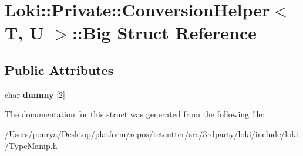 \hypertarget{structLoki_1_1Private_1_1ConversionHelper_1_1Big}{}\section{Loki\+:\+:Private\+:\+:Conversion\+Helper$<$ T, U $>$\+:\+:Big Struct Reference}
\label{structLoki_1_1Private_1_1ConversionHelper_1_1Big}
\subsection*{Public Attributes}
\begin{DoxyCompactItemize}
\item 
\hypertarget{structLoki_1_1Private_1_1ConversionHelper_1_1Big_a58c63ac7e3902931b7747405d51d8d40}{}char {\bfseries dummy} \mbox{[}2\mbox{]}\label{structLoki_1_1Private_1_1ConversionHelper_1_1Big_a58c63ac7e3902931b7747405d51d8d40}

\end{DoxyCompactItemize}


The documentation for this struct was generated from the following file\+:\begin{DoxyCompactItemize}
\item 
/\+Users/pourya/\+Desktop/platform/repos/tetcutter/src/3rdparty/loki/include/loki/Type\+Manip.\+h\end{DoxyCompactItemize}
